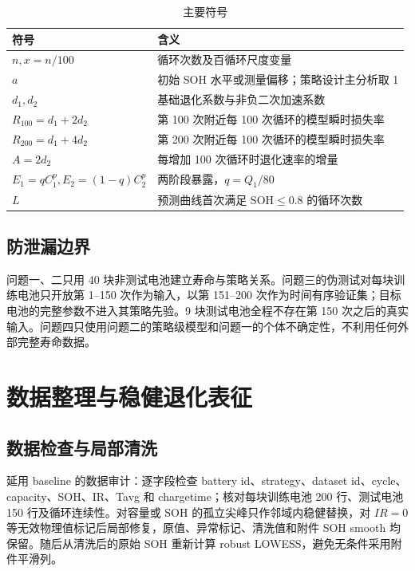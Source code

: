 \documentclass[UTF8,a4paper,zihao=-4]{ctexart}
\newcommand{\SOH}{\mathrm{SOH}}
\newcommand{\Rone}{R_{100}}
\newcommand{\Rtwo}{R_{200}}
\begin{document}
\begin{table}[H]
\centering
\caption{主要符号}
\begin{tabularx}{0.93\textwidth}{>{\centering\arraybackslash}p{2.4cm}X}
\toprule
符号 & 含义 \\
\midrule
$n,x=n/100$ & 循环次数及百循环尺度变量 \\
$a$ & 初始 SOH 水平或测量偏移；策略设计主分析取 1 \\
$d_1,d_2$ & 基础退化系数与非负二次加速系数 \\
$\Rone=d_1+2d_2$ & 第 100 次附近每 100 次循环的模型瞬时损失率 \\
$\Rtwo=d_1+4d_2$ & 第 200 次附近每 100 次循环的模型瞬时损失率 \\
$A=2d_2$ & 每增加 100 次循环时退化速率的增量 \\
$E_1=qC_1^p,E_2=(1-q)C_2^p$ & 两阶段暴露，$q=Q_1/80$ \\
$L$ & 预测曲线首次满足 $\SOH\leq0.8$ 的循环次数 \\
\bottomrule
\end{tabularx}
\end{table}

\subsection{防泄漏边界}

问题一、二只用 40 块非测试电池建立寿命与策略关系。问题三的伪测试对每块训练电池只开放第 1--150 次作为输入，以第 151--200 次作为时间有序验证集；目标电池的完整参数不进入其策略先验。9 块测试电池全程不存在第 150 次之后的真实输入。问题四只使用问题二的策略级模型和问题一的个体不确定性，不利用任何外部完整寿命数据。

\section{数据整理与稳健退化表征}

\subsection{数据检查与局部清洗}

延用 baseline 的数据审计：逐字段检查 battery id、strategy、dataset id、cycle、capacity、SOH、IR、Tavg 和 chargetime；核对每块训练电池 200 行、测试电池 150 行及循环连续性。对容量或 SOH 的孤立尖峰只作邻域内稳健替换，对 $IR=0$ 等无效物理值标记后局部修复，原值、异常标记、清洗值和附件 SOH smooth 均保留。随后从清洗后的原始 SOH 重新计算 robust LOWESS，避免无条件采用附件平滑列。
\end{document}
